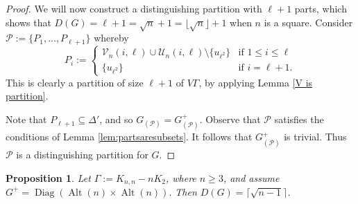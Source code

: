 \documentclass[11pt]{amsart}
\newtheorem{proposition}[theorem]{Proposition}
\DeclareMathOperator{\Alt}{Alt}
\DeclareMathOperator{\Aut}{Aut}
\DeclareMathOperator{\Diag}{Diag}
\begin{document}
\begin{proof}

We will now construct a distinguishing partition with \(\ell+1\) parts, which shows that \(D(G)=\ell+1=\sqrt{n}+1=\lfloor \sqrt{n}\rfloor +1\) when \(n\) is a square.
Consider \(\mathcal{P}:=\{P_{1},\ldots, P_{\ell+1}\}\)  whereby 
\begin{equation}
P_{i}:=
\begin{cases}
    \mathcal{V}_n(i,\ell)\cup\mathcal{U}_n(i,\ell) \setminus \{u_{\ell^{2}}\} & \text{if } 1\leqslant i\leqslant \ell\\
    \{u_{\ell^{2}}\} & \text{if } i=\ell+1.
\end{cases}
\end{equation}
This is clearly a partition of size $\ell+1$ of \(V\Gamma\),
by applying Lemma \ref{V is partition}.


%


Note that  \(P_{\ell+1}\subseteq \Delta'\),
and so $G_{(\mathcal{P})}=G^+_{(\mathcal{P})}$. 
Observe that \(\mathcal{P}\) satisfies the conditions of Lemma \ref{lem:partsaresubsets}. It follows that $G^+_{(\mathcal{P})}$ is trivial.
Thus $\mathcal{P}$ is a distinguishing partition for $G$.
\end{proof}



\begin{proposition}\label{prop:DGdiag-Alt}
Let \(\Gamma:=K_{n,n}-n K_2\), where $n\geqslant3$, and assume $G^+=\Diag(\Alt(n)\times \Alt(n)).$
Then \(D(G)=\lceil \sqrt{n - 1}\rceil\).
\end{proposition} 
\end{document}
